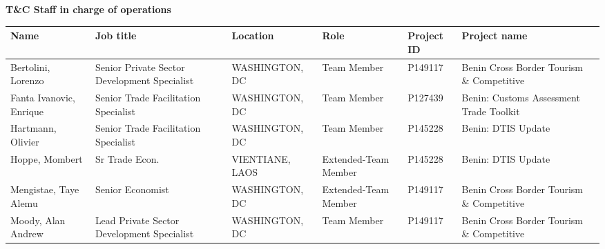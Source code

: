 \documentclass{article}\usepackage[]{graphicx}\usepackage[]{color}
\begin{document}
\begin{minipage}[b]{0.99\textwidth}
  \vspace*{1cm}
  \raggedright{\color{white!30!blue} \textbf{\large T\&C Staff in charge of operations}}
  \vspace*{0.5cm}
     
{\small
\begin{tabular}{>{\raggedright}p{1.4in}>{\raggedright}p{1in}>{\raggedright}p{1in}>{\raggedright}p{1in}l>{\raggedright}p{1.5in}l}
 Name & Job title & Location & Role & Project ID & Project name &  \\ 
  \hline
Bertolini, Lorenzo & Senior Private Sector Development Specialist & WASHINGTON, DC & Team Member & P149117 & Benin Cross Border Tourism \& Competitive &  \\ 
  Fanta Ivanovic, Enrique & Senior Trade Facilitation Specialist & WASHINGTON, DC & Team Member & P127439 & Benin: Customs Assessment Trade Toolkit &  \\ 
  Hartmann, Olivier & Senior Trade Facilitation Specialist & WASHINGTON, DC & Team Member & P145228 & Benin: DTIS Update &  \\ 
  Hoppe, Mombert & Sr Trade Econ. & VIENTIANE, LAOS & Extended-Team Member & P145228 & Benin: DTIS Update &  \\ 
  Mengistae, Taye Alemu & Senior Economist & WASHINGTON, DC & Extended-Team Member & P149117 & Benin Cross Border Tourism \& Competitive &  \\ 
  Moody, Alan Andrew & Lead Private Sector Development Specialist & WASHINGTON, DC & Team Member & P149117 & Benin Cross Border Tourism \& Competitive &  \\ 
  \end{tabular}
}

     \vspace*{0.5cm}
\end{minipage}

\end{document}
